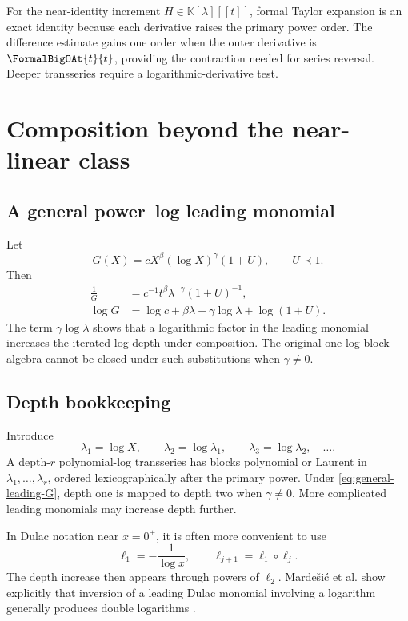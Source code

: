 \documentclass[11pt,openany]{book}
\theoremstyle{definition}
\theoremstyle{plain}
\theoremstyle{remark}
\newcommand{\K}{\mathbb{K}}
\newcommand{\precdom}{\prec}
\begin{document}
\begin{summarybox}
For the near-identity increment \(H\in\K[\lambda][[t]]\), formal Taylor expansion is an exact identity because each derivative raises the primary power order. The difference estimate gains one order when the outer derivative is \(\FormalBigOAt{t}{t}\), providing the contraction needed for series reversal. Deeper transseries require a logarithmic-derivative test.
\end{summarybox}

\chapter{Composition beyond the near-linear class}\label{ch:composition-depth}

\section{A general power--log leading monomial}
Let
\begin{equation}\label{eq:general-leading-G}
 G(X)=cX^\beta(\log X)^\gamma(1+U),
 \qquad U\precdom1.
\end{equation}
Then
\begin{align}
 \frac1G&=c^{-1}t^\beta\lambda^{-\gamma}(1+U)^{-1},
 \label{eq:general-t-sub}\\
 \log G&=\log c+\beta\lambda+\gamma\log\lambda+\log(1+U).
 \label{eq:general-lambda-sub}
\end{align}
The term \(\gamma\log\lambda\) shows that a logarithmic factor in the leading monomial increases the iterated-log depth under composition. The original one-log block algebra cannot be closed under such substitutions when \(\gamma\ne0\).

\section{Depth bookkeeping}
Introduce
\[
 \lambda_1=\log X,
 \qquad \lambda_2=\log\lambda_1,
 \qquad \lambda_3=\log\lambda_2,
 \quad\ldots.
\]
A depth-\(r\) polynomial-log transseries has blocks polynomial or Laurent in \(\lambda_1,\ldots,\lambda_r\), ordered lexicographically after the primary power. Under \cref{eq:general-leading-G}, depth one is mapped to depth two when \(\gamma\ne0\). More complicated leading monomials may increase depth further.

In Dulac notation near \(x=0^+\), it is often more convenient to use
\[
 \ell_1=-\frac1{\log x},
 \qquad \ell_{j+1}=\ell_1\circ\ell_j.
\]
The depth increase then appears through powers of \(\ell_2\). Marde\v{s}i\'c et al. show explicitly that inversion of a leading Dulac monomial involving a logarithm generally produces double logarithms \cite{mardesic-length}.
\end{document}
